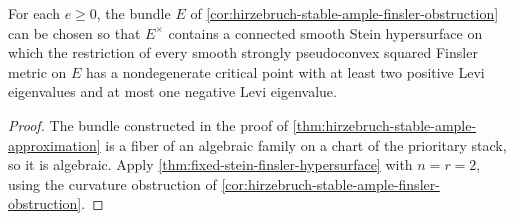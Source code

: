 \begin{corollary}\label{cor:hirzebruch-fixed-stein-hypersurface}
For each $e\geq0$, the bundle $E$ of \cref{cor:hirzebruch-stable-ample-finsler-obstruction} can be chosen so that $E^\times$ contains a connected smooth Stein hypersurface on which the restriction of every smooth strongly pseudoconvex squared Finsler metric on $E$ has a nondegenerate critical point with at least two positive Levi eigenvalues and at most one negative Levi eigenvalue.
\end{corollary}
\begin{proof}
The bundle constructed in the proof of \cref{thm:hirzebruch-stable-ample-approximation} is a fiber of an algebraic family on a chart of the prioritary stack, so it is algebraic. Apply \cref{thm:fixed-stein-finsler-hypersurface} with $n=r=2$, using the curvature obstruction of \cref{cor:hirzebruch-stable-ample-finsler-obstruction}.
\end{proof}
